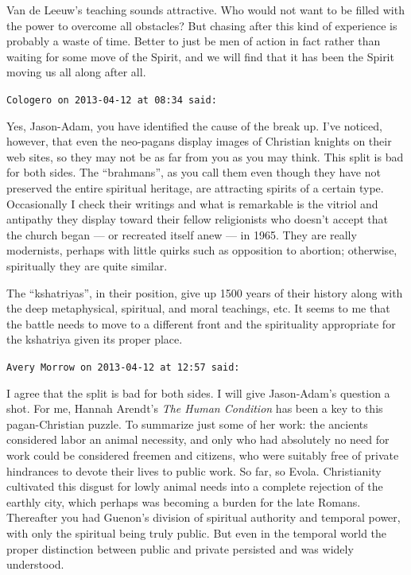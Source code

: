 \begin{footnotesize}
\begin{sffamily}
Van de Leeuw's teaching sounds attractive. Who would not want to be filled with the power to overcome all obstacles? But chasing after this kind of experience is probably a waste of time. Better to just be men of action in fact rather than waiting for some move of the Spirit, and we will find that it has been the Spirit moving us all along after all.

\hfill

\texttt{Cologero on 2013-04-12 at 08:34 said:}

Yes, Jason-Adam, you have identified the cause of the break up. I've noticed, however, that even the neo-pagans display images of Christian knights on their web sites, so they may not be as far from you as you may think. This split is bad for both sides. The ``brahmans'', as you call them even though they have not preserved the entire spiritual heritage, are attracting spirits of a certain type. Occasionally I check their writings and what is remarkable is the vitriol and antipathy they display toward their fellow religionists who doesn't accept that the church began --- or recreated itself anew --- in 1965. They are really modernists, perhaps with little quirks such as opposition to abortion; otherwise, spiritually they are quite similar.

The ``kshatriyas'', in their position, give up 1500 years of their history along with the deep metaphysical, spiritual, and moral teachings, etc. It seems to me that the battle needs to move to a different front and the spirituality appropriate for the kshatriya given its proper place.

\hfill

\texttt{Avery Morrow on 2013-04-12 at 12:57 said:}

I agree that the split is bad for both sides. I will give Jason-Adam's question a shot. For me, Hannah Arendt's \emph{The Human Condition} has been a key to this pagan-Christian puzzle. To summarize just some of her work: the ancients considered labor an animal necessity, and only who had absolutely no need for work could be considered freemen and citizens, who were suitably free of private hindrances to devote their lives to public work. So far, so Evola. Christianity cultivated this disgust for lowly animal needs into a complete rejection of the earthly city, which perhaps was becoming a burden for the late Romans. Thereafter you had Guenon's division of spiritual authority and temporal power, with only the spiritual being truly public. But even in the temporal world the proper distinction between public and private persisted and was widely understood.


\end{sffamily}
\end{footnotesize}
